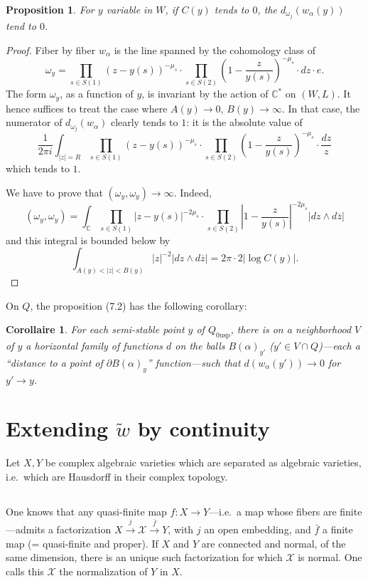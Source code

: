 \documentclass[12pt,a4paper]{article}
\theoremstyle{plain}
\newtheorem{proposition}[theorem]{Proposition}
\newtheorem{corollary}[theorem]{Corollaire}
\theoremstyle{definition}
\theoremstyle{remark}
\newcommand{\CC}{\mathbb{C}}
\numberwithin{equation}{section}
\providecommand{\CC}{\mathbb{C}}
\begin{document}
\begin{proposition}\label{prop:7.2}
For $y$ variable in $W$, if $C(y)$ tends to $0$, the $d_{\omega_j}(w_\alpha(y))$ tend to $0$.
\end{proposition}

\begin{proof}
Fiber by fiber $w_\alpha$ is the line spanned by the cohomology class of
\[
\omega_y = \prod_{s \in S(1)} (z - y(s))^{-\mu_s} \cdot \prod_{s \in S(2)} \left(1 - \frac{z}{y(s)}\right)^{-\mu_s} \cdot dz \cdot e.
\]
The form $\omega_y$, as a function of $y$, is invariant by the action of $\CC^*$ on $(W, L)$. It hence suffices to treat the case where $A(y) \to 0$, $B(y) \to \infty$. In that case, the numerator of $d_{\omega_j}(w_\alpha)$ clearly tends to $1$: it is the absolute value of
\[
\frac{1}{2\pi i} \int_{|z|=R} \prod_{s \in S(1)} (z - y(s))^{-\mu_s} \cdot \prod_{s \in S(2)} \left(1 - \frac{z}{y(s)}\right)^{-\mu_s} \cdot \frac{dz}{z}
\]
which tends to $1$.

We have to prove that $(\omega_y, \omega_y) \to \infty$. Indeed,
\[
(\omega_y, \omega_y) = \int_{\CC} \prod_{s \in S(1)} |z - y(s)|^{-2\mu_s} \cdot \prod_{s \in S(2)} \left|1 - \frac{z}{y(s)}\right|^{-2\mu_s} |dz \wedge d\overline{z}|
\]
and this integral is bounded below by
\[
\int_{A(y) < |z| < B(y)} |z|^{-2} |dz \wedge d\overline{z}| = 2\pi \cdot 2 |\log C(y)|.
\]
\end{proof}

On $Q$, the proposition (7.2) has the following corollary:
\begin{corollary}\label{cor:7.3}
For each semi-stable point $y$ of $Q_{0\mathrm{usp}}$, there is on a neighborhood $V$ of $y$ a horizontal family of functions $d$ on the balls $B(\alpha)_{y'}$ ($y' \in V \cap Q$)---each a ``distance to a point of $\partial B(\alpha)_y$'' function---such that $d(w_\alpha(y')) \to 0$ for $y' \to y$.
\end{corollary}


\section{Extending $\widetilde{w}$ by continuity}

Let $X, Y$ be complex algebraic varieties which are separated as algebraic varieties, i.e.\ which are Hausdorff in their complex topology.

\subsection{}
One knows that any quasi-finite map $f: X \to Y$---i.e.\ a map whose fibers are finite---admits a factorization $X \xrightarrow{j} \mathcal{X} \xrightarrow{\bar{f}} Y$, with $j$ an open embedding, and $\bar{f}$ a finite map (= quasi-finite and proper). If $X$ and $Y$ are connected and normal, of the same dimension, there is an unique such factorization for which $\mathcal{X}$ is normal. One calls this $\mathcal{X}$ the normalization of $Y$ in $X$.
\end{document}
